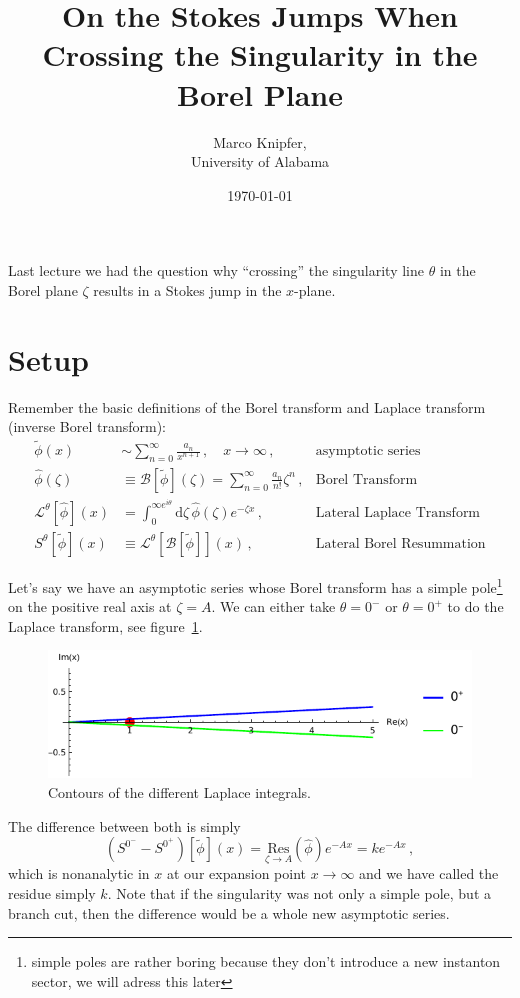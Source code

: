 \documentclass[11pt,a4paper]{scrartcl}
\title{On the Stokes Jumps When Crossing the Singularity in the Borel Plane}
\date{\today}
\author{Marco Knipfer, \\ University of Alabama}
\newcommand{\diff}{\mathrm{d}}
\begin{document}
\maketitle
Last lecture we had the question why ``crossing'' the singularity line $\theta$ in the Borel plane $\zeta$
results in a Stokes jump in the $x$-plane.

\section{Setup}
Remember the basic definitions of the Borel transform and Laplace transform (inverse Borel transform):
\begin{align}
	\tilde{\phi}(x) &\sim \sum_{n=0}^\infty \frac{a_n}{x^{n+1}}\,, \quad x\to \infty \,,&\text{asymptotic series} \\
	\hat{\phi}(\zeta) &\equiv \mathcal{B}[\tilde{\phi}](\zeta) = \sum_{n=0}^\infty \frac{a_n}{n!} \zeta^n\,,
			  &\text{Borel Transform}\\
	\mathcal{L}^\theta [\hat{\phi}](x) &= \int_0^{\infty e^{i \theta}}\diff\zeta\, \hat{\phi}(\zeta) e^{- \zeta x}\,,
					       &\text{Lateral Laplace Transform}\\
	S^\theta[\tilde{\phi}](x) &\equiv \mathcal{L}^\theta[\mathcal{B}[\tilde{\phi}]](x)\,, &\text{Lateral Borel Resummation}
\end{align}

Let's say we have an asymptotic series whose Borel transform has a simple pole\footnote{simple poles
are rather boring because they don't introduce a new instanton sector, we will adress this later} on the positive
real axis at $\zeta = A$.
We can either take $\theta = 0^-$ or $\theta = 0^+$ to do the Laplace transform, see figure~\ref{fig:laplaceContours}.
\begin{figure}
	\centering
	  \includegraphics[width=0.8\linewidth]{laplace.pdf}
	  \caption{Contours of the different Laplace integrals.}
	  \label{fig:laplaceContours}
\end{figure}
The difference between both is simply
\begin{equation}
	\left( S^{0^-} - S^{0^+} \right)[\tilde{\phi}](x) = \underset{\zeta\to A}{\mathrm{Res}}(\hat\phi) e^{- A x}
	= k e^{-Ax}\,,
	\label{eq:ambiguity}
\end{equation}
which is nonanalytic in $x$ at our expansion point $x\to\infty$ and we have called the residue simply $k$.
Note that if the singularity was not only a simple pole, but a branch cut, then the difference would be a
whole new asymptotic series.
\end{document}
